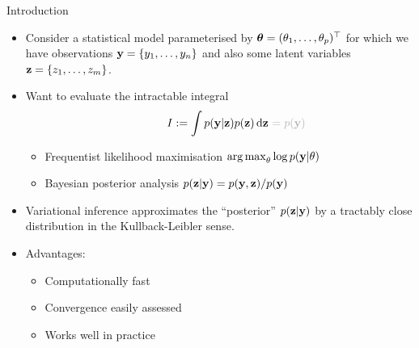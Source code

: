 \begin{frame}{Introduction}
  \begin{itemize}
    \item Consider a statistical model 
    parameterised by ${\bm\theta} = (\theta_1,\dots,\theta_p)^\top$ 
    for which we have observations ${\mathbf y} = \{y_1, \dots, y_n\}$ and also some latent variables ${\mathbf z} = \{z_1, \dots, z_m\}$.
    \pause  
    \item Want to evaluate the intractable integral
    \[
      I := \int p(\by|\bz)p(\bz) \d\bz \ \rlap{\color{gray!60} $= p(\by)$}
    \]
    \vspace{-0.8em}
    \begin{itemize}
      \item Frequentist likelihood maximisation {\color{gray!60} $\operatorname*{arg\,max}_\theta \log p({\mathbf y}|\theta)$} \vspace{0.2em}
      \item Bayesian posterior analysis {\color{gray!60} $p({\mathbf z}|{\mathbf y})=p({\mathbf y},{\mathbf z})/p({\mathbf y})$}
    \end{itemize}
    \pause
    \item Variational inference approximates the ``posterior'' $p({\mathbf z}|{\mathbf y})$ by a tractably close distribution in the Kullback-Leibler sense.
    \item<4-> Advantages:
    \begin{itemize}
      \item Computationally fast
      \item Convergence easily assessed
      \item Works well in practice
    \end{itemize}
  \end{itemize}
\end{frame}

